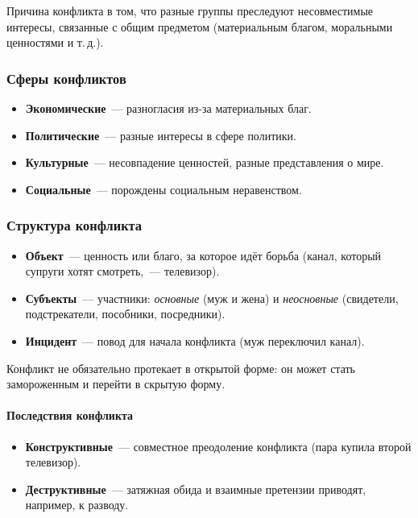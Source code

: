 \documentclass[12pt]{article}
\begin{document}
	\begin{note}
		Причина конфликта в том, что разные группы преследуют несовместимые интересы, связанные с общим предметом (материальным благом, моральными ценностями и т.\,д.).
	\end{note}

	\subsubsection{Сферы конфликтов}

	\begin{itemize}
		\item \textbf{Экономические}~--- разногласия из-за материальных благ.
		\item \textbf{Политические}~--- разные интересы в сфере политики.
		\item \textbf{Культурные}~--- несовпадение ценностей, разные представления о мире.
		\item \textbf{Социальные}~--- порождены социальным неравенством.
	\end{itemize}

	\subsubsection{Структура конфликта}

	\begin{itemize}
		\item \textbf{Объект}~--- ценность или благо, за которое идёт борьба (канал, который супруги хотят смотреть,~--- телевизор).
		\item \textbf{Субъекты}~--- участники: \textit{основные} (муж и жена) и \textit{неосновные} (свидетели, подстрекатели, пособники, посредники).
		\item \textbf{Инцидент}~--- повод для начала конфликта (муж переключил канал).
	\end{itemize}

	\begin{note}
		Конфликт не обязательно протекает в открытой форме: он может стать замороженным и перейти в скрытую форму.
	\end{note}

	\paragraph{Последствия конфликта}
	\begin{itemize}
		\item \textbf{Конструктивные}~--- совместное преодоление конфликта (пара купила второй телевизор).
		\item \textbf{Деструктивные}~--- затяжная обида и взаимные претензии приводят, например, к разводу.
	\end{itemize}
\end{document}
